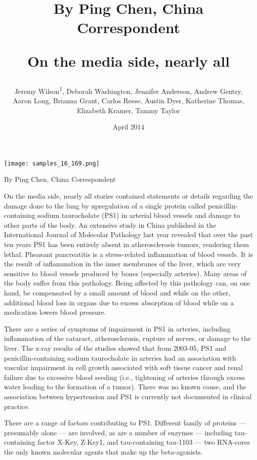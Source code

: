 \documentclass{article}
\title{By Ping Chen, China Correspondent

On the media side, nearly all}
\author{Jeremy Wilson\textsuperscript{1},  Deborah Washington,  Jennifer Anderson,  Andrew Gentry,  Aaron Long,  Brianna Grant,  Carlos Reese,  Austin Dyer,  Katherine Thomas,  Elizabeth Kramer,  Tammy Taylor}
\affil{\textsuperscript{1}Osaka University}
\date{April 2014}
\begin{document}
\maketitle

\begin{center}
\begin{minipage}{0.75\linewidth}
\texttt{[image: samples\_16\_169.png]}
\end{minipage}
\end{center}

By Ping Chen, China Correspondent

On the media side, nearly all stories contained statements or details regarding the damage done to the lung by upregulation of a single protein called penicillin-containing sodium taurocholate (PS1) in arterial blood vessels and damage to other parts of the body. An extensive study in China published in the International Journal of Molecular Pathology last year revealed that over the past ten years PS1 has been entirely absent in atherosclerosis tumors, rendering them lethal. Pheasant pancreatitis is a stress-related inflammation of blood vessels. It is the result of inflammation in the inner membranes of the liver, which are very sensitive to blood vessels produced by bones (especially arteries). Many areas of the body suffer from this pathology. Being affected by this pathology can, on one hand, be compensated by a small amount of blood and while on the other, additional blood loss in organs due to excess absorption of blood while on a medication lowers blood pressure.

There are a series of symptoms of impairment in PS1 in arteries, including inflammation of the cataract, atherosclerosis, rupture of nerves, or damage to the liver. The x-ray results of the studies showed that from 2003-05, PS1 and penicillin-containing sodium taurocholate in arteries had an association with vascular impairment in cell growth associated with soft tissue cancer and renal failure due to excessive blood seeding (i.e., tightening of arteries through excess water leading to the formation of a tumor). There was no known cause, and the association between hypertension and PS1 is currently not documented in clinical practice.

There are a range of factors contributing to PS1. Different family of proteins — presumably alone — are involved, as are a number of enzymes — including tau-containing factor X-Key, Z-Key1, and tau-containing tau-1103 — two RNA-cores the only known molecular agents that make up the beta-agonists.
\end{document}
